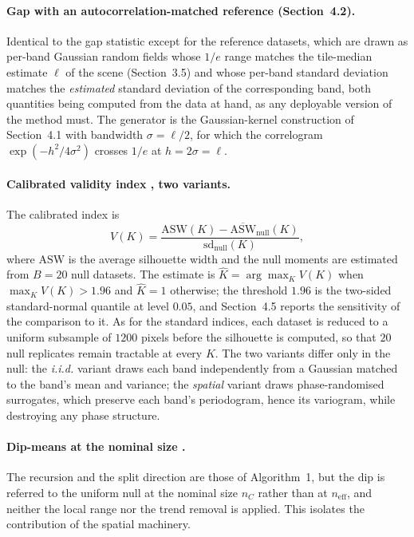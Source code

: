 \documentclass[11pt]{article}
\newcommand{\neff}{n_{\mathrm{eff}}}
\begin{document}
\paragraph{Gap with an autocorrelation-matched reference (Section~4.2).}
Identical to the gap statistic except for the reference datasets, which are
drawn as per-band Gaussian random fields whose $1/e$ range matches the
tile-median estimate $\ell$ of the scene (Section~3.5) and whose per-band
standard deviation matches the \emph{estimated} standard deviation of the
corresponding band, both quantities being computed from the data at hand, as
any deployable version of the method must. The generator is the Gaussian-kernel
construction of Section~4.1 with bandwidth $\sigma=\ell/2$, for which the
correlogram $\exp(-h^{2}/4\sigma^{2})$ crosses $1/e$ at $h=2\sigma=\ell$.

\paragraph{Calibrated validity index \citep{HennigLin2015}, two variants.}
The calibrated index is
\begin{equation}\label{eq:hl}
  V(K)=\frac{\mathrm{ASW}(K)-\overline{\mathrm{ASW}}_{\mathrm{null}}(K)}
             {\mathrm{sd}_{\mathrm{null}}(K)},
\end{equation}
where $\mathrm{ASW}$ is the average silhouette width and the null moments are
estimated from $B=20$ null datasets. The estimate is
$\hat K=\arg\max_K V(K)$ when $\max_K V(K)>1.96$ and $\hat K=1$ otherwise; the
threshold $1.96$ is the two-sided standard-normal quantile at level $0.05$, and
Section~4.5 reports the sensitivity of the comparison to it. As for the
standard indices, each dataset is reduced to a uniform subsample of $1200$
pixels before the silhouette is computed, so that $20$ null replicates remain
tractable at every $K$. The two variants differ only in the null: the
\emph{i.i.d.} variant draws each band independently from a Gaussian matched to
the band's mean and variance; the \emph{spatial} variant draws phase-randomised
surrogates, which preserve each band's periodogram, hence its variogram, while
destroying any phase structure.

\paragraph{Dip-means at the nominal size \citep{Kalogeratos2012}.}
The recursion and the split direction are those of Algorithm~1, but the dip is
referred to the uniform null at the nominal size $n_C$ rather than at
$\neff$, and neither the local range nor the trend removal is applied. This
isolates the contribution of the spatial machinery.
\end{document}
